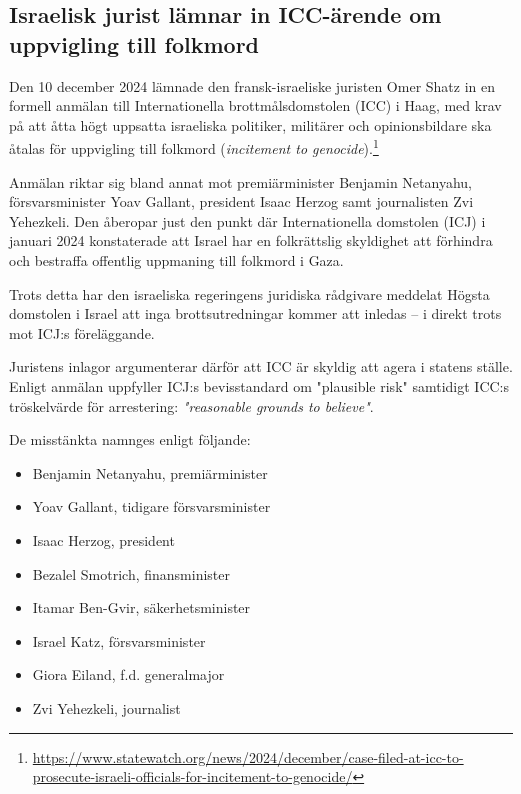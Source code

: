 \documentclass[12pt]{article}
\begin{document}
\subsection{Israelisk jurist lämnar in ICC-ärende om uppvigling till folkmord}

Den 10 december 2024 lämnade den fransk-israeliske juristen Omer Shatz in en formell anmälan till Internationella brottmålsdomstolen (ICC) i Haag, med krav på att åtta högt uppsatta israeliska politiker, militärer och opinionsbildare ska åtalas för uppvigling till folkmord (\textit{incitement to genocide}).\footnote{\url{https://www.statewatch.org/news/2024/december/case-filed-at-icc-to-prosecute-israeli-officials-for-incitement-to-genocide/}}

Anmälan riktar sig bland annat mot premiärminister Benjamin Netanyahu, försvarsminister Yoav Gallant, president Isaac Herzog samt journalisten Zvi Yehezkeli. Den åberopar just den punkt där Internationella domstolen (ICJ) i januari 2024 konstaterade att Israel har en folkrättslig skyldighet att förhindra och bestraffa offentlig uppmaning till folkmord i Gaza.

Trots detta har den israeliska regeringens juridiska rådgivare meddelat Högsta domstolen i Israel att inga brottsutredningar kommer att inledas – i direkt trots mot ICJ:s föreläggande.

Juristens inlagor argumenterar därför att ICC är skyldig att agera i statens ställe. Enligt anmälan uppfyller ICJ:s bevisstandard om "plausible risk" samtidigt ICC:s tröskelvärde för arrestering: \textit{"reasonable grounds to believe"}.

De misstänkta namnges enligt följande:

\begin{itemize}
  \item Benjamin Netanyahu, premiärminister
  \item Yoav Gallant, tidigare försvarsminister
  \item Isaac Herzog, president
  \item Bezalel Smotrich, finansminister
  \item Itamar Ben-Gvir, säkerhetsminister
  \item Israel Katz, försvarsminister
  \item Giora Eiland, f.d. generalmajor
  \item Zvi Yehezkeli, journalist
\end{itemize}
\end{document}
